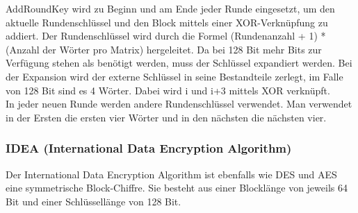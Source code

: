 \documentclass[11pt]{scrartcl}
\begin{document}
\noindent
AddRoundKey wird zu Beginn und am Ende jeder Runde eingesetzt, um den aktuelle Rundenschlüssel und den Block mittels einer XOR-Verknüpfung zu addiert. Der Rundenschlüssel wird durch die Formel (Rundenanzahl + 1) * (Anzahl der Wörter pro Matrix) hergeleitet. Da bei 128 Bit mehr Bits zur Verfügung stehen als benötigt werden, muss der Schlüssel expandiert werden. Bei der Expansion wird der externe Schlüssel in seine Bestandteile zerlegt, im Falle von 128 Bit sind es 4 Wörter. Dabei wird i und i+3 mittels XOR verknüpft.\\
In jeder neuen Runde werden andere Rundenschlüssel verwendet. Man verwendet in der Ersten die ersten vier Wörter und in den nächsten die nächsten vier. \cite{2}



\subsubsection{IDEA (International Data Encryption Algorithm)}
\label{sec:international-data-encryption-algorithm}
Der International Data Encryption Algorithm ist ebenfalls wie DES und AES eine symmetrische Block-Chiffre. Sie besteht aus einer Blocklänge von jeweils 64 Bit und einer Schlüssellänge von 128 Bit. \cite{3}\\
\end{document}
